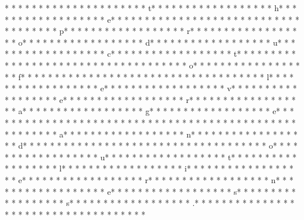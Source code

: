 * *  *  * * *  * * *  * * *  *  * * *  *  * * *  * t* * *  * * *  * * *  *  * * *  *  * * *  * h* * *  * * *  * * *  *  * * *  *  * * *  * e* * *  * * *  * * *  *  * * *  *  * * *  *  * * *  * * *  * * *  *  * * *  *  * * *  * p* * *  * * *  * * *  *  * * *  *  * * *  * r* * *  * * *  * * *  *  * * *  *  * * *  * o* * *  * * *  * * *  *  * * *  *  * * *  * d* * *  * * *  * * *  *  * * *  *  * * *  * u* * *  * * *  * * *  *  * * *  *  * * *  * c* * *  * * *  * * *  *  * * *  *  * * *  * t* * *  * * *  * * *  *  * * *  *  * * *  *  * * *  * * *  * * *  *  * * *  *  * * *  * o* * *  * * *  * * *  *  * * *  *  * * *  * f* * *  * * *  * * *  *  * * *  *  * * *  *  * * *  * * *  * * *  *  * * *  *  * * *  * l* * *  * * *  * * *  *  * * *  *  * * *  * e* * *  * * *  * * *  *  * * *  *  * * *  * v* * *  * * *  * * *  *  * * *  *  * * *  * e* * *  * * *  * * *  *  * * *  *  * * *  * r* * *  * * *  * * *  *  * * *  *  * * *  * a* * *  * * *  * * *  *  * * *  *  * * *  * g* * *  * * *  * * *  *  * * *  *  * * *  * e* * *  * * *  * * *  *  * * *  *  * * *  *  * * *  * * *  * * *  *  * * *  *  * * *  * 
* * *  * * *  * * *  *  * * *  *  * * *  * a* * *  * * *  * * *  *  * * *  *  * * *  * n* * *  * * *  * * *  *  * * *  *  * * *  * d* * *  * * *  * * *  *  * * *  *  * * *  *  * * *  * * *  * * *  *  * * *  *  * * *  * o* * *  * * *  * * *  *  * * *  *  * * *  * u* * *  * * *  * * *  *  * * *  *  * * *  * t* * *  * * *  * * *  *  * * *  *  * * *  * l* * *  * * *  * * *  *  * * *  *  * * *  * i* * *  * * *  * * *  *  * * *  *  * * *  * e* * *  * * *  * * *  *  * * *  *  * * *  * r* * *  * * *  * * *  *  * * *  *  * * *  * n* * *  * * *  * * *  *  * * *  *  * * *  * e* * *  * * *  * * *  *  * * *  *  * * *  * s* * *  * * *  * * *  *  * * *  *  * * *  * s* * *  * * *  * * *  *  * * *  *  * * *  * .* * *  * * *  * * *  *  * * *  *  * * *  *  * * *  * * *  * * *  *  * * *  *  * * *  * 
